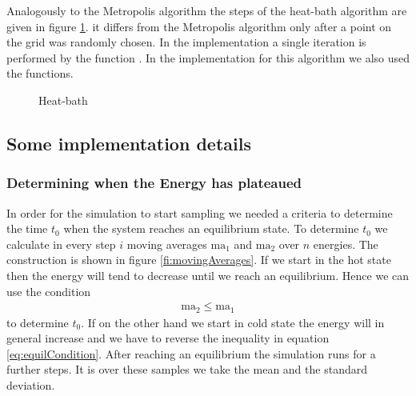 Analogously to the Metropolis algorithm the steps of the heat-bath algorithm are given in figure \ref{alg:heat-bath}. it differs from the Metropolis algorithm only after a point on the grid was randomly chosen. In the implementation a single iteration is performed by the function . In the implementation for this algorithm we also used the  functions.

\begin{figure}
\centering
\begin{algorithm}[H]
\caption{Heat-bath}
\label{alg:heat-bath}

\BlankLine
{}
\end{algorithm}
\end{figure}

\subsection{Some implementation details}

\subsubsection{Determining when the Energy has plateaued}

In order for the simulation to start sampling we needed a criteria to determine the time $t_0$ when the system reaches an equilibrium state.
 To determine $t_0$ we calculate in every step $i$ moving averages $\text{ma}_1$ and $\text{ma}_2$ over $n$ energies. The construction is shown in figure \ref{fi:movingAverages}. If we start in the hot state then the energy will tend to decrease until we reach an equilibrium. Hence we can use the condition
\begin{align}
	\text{ma}_2 \leq \text{ma}_1 \label{eq:equilCondition}
\end{align}
to determine $t_0$. If on the other hand we start in cold state the energy will in general increase and we have to reverse the inequality in equation \eqref{eq:equilCondition}. After reaching an equilibrium the simulation runs for a further  steps. It is over these samples we take the mean and the standard deviation.

